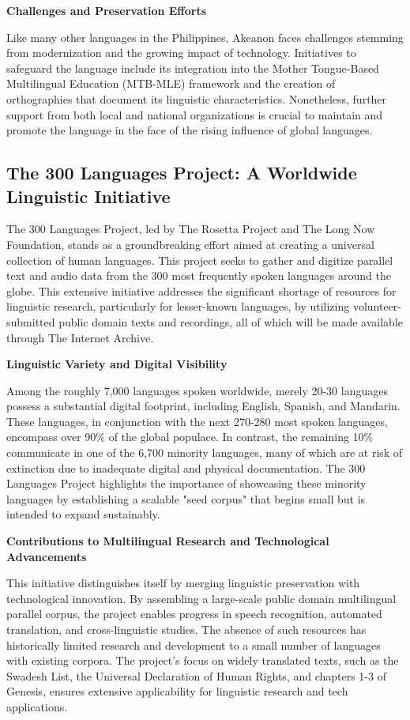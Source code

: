 \textbf{Challenges and Preservation Efforts}

Like many other languages in the Philippines, Akeanon faces challenges stemming from modernization and the growing impact of technology. Initiatives to safeguard the language include its integration into the Mother Tongue-Based Multilingual Education (MTB-MLE) framework and the creation of orthographies that document its linguistic characteristics. Nonetheless, further support from both local and national organizations is crucial to maintain and promote the language in the face of the rising influence of global languages.

\subsection{The 300 Languages Project: A Worldwide Linguistic Initiative}
The 300 Languages Project, led by The Rosetta Project and The Long Now Foundation, stands as a groundbreaking effort aimed at creating a universal collection of human languages. This project seeks to gather and digitize parallel text and audio data from the 300 most frequently spoken languages around the globe. This extensive initiative addresses the significant shortage of resources for linguistic research, particularly for lesser-known languages, by utilizing volunteer-submitted public domain texts and recordings, all of which will be made available through The Internet Archive.

\textbf{Linguistic Variety and Digital Visibility}

Among the roughly 7,000 languages spoken worldwide, merely 20-30 languages possess a substantial digital footprint, including English, Spanish, and Mandarin. These languages, in conjunction with the next 270-280 most spoken languages, encompass over 90\% of the global populace. In contrast, the remaining 10\% communicate in one of the 6,700 minority languages, many of which are at risk of extinction due to inadequate digital and physical documentation. The 300 Languages Project highlights the importance of showcasing these minority languages by establishing a scalable "seed corpus" that begins small but is intended to expand sustainably.

\textbf{Contributions to Multilingual Research and Technological Advancements}

This initiative distinguishes itself by merging linguistic preservation with technological innovation. By assembling a large-scale public domain multilingual parallel corpus, the project enables progress in speech recognition, automated translation, and cross-linguistic studies. The absence of such resources has historically limited research and development to a small number of languages with existing corpora. The project’s focus on widely translated texts, such as the Swadesh List, the Universal Declaration of Human Rights, and chapters 1-3 of Genesis, ensures extensive applicability for linguistic research and tech applications.

